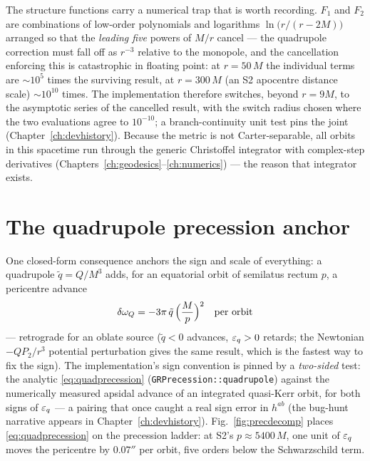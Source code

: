 The structure functions carry a numerical trap that is worth recording.
$F_1$ and $F_2$ are combinations of low-order polynomials and
logarithms $\ln\!\bigl(r/(r-2M)\bigr)$ arranged so that the
\emph{leading five} powers of $M/r$ cancel — the quadrupole correction
must fall off as $r^{-3}$ relative to the monopole, and the cancellation
enforcing this is catastrophic in floating point: at $r = 50\,M$ the
individual terms are $\sim 10^{5}$ times the surviving result, at
$r = 300\,M$ (an S2 apocentre distance scale) $\sim 10^{10}$ times.
The implementation therefore switches, beyond $r = 9M$, to the
asymptotic series of the cancelled result, with the switch radius chosen
where the two evaluations agree to $10^{-10}$; a branch-continuity unit
test pins the joint (Chapter~\ref{ch:devhistory}). Because the metric is
not Carter-separable, all orbits in this spacetime run through the
generic Christoffel integrator with complex-step derivatives
(Chapters~\ref{ch:geodesics}--\ref{ch:numerics}) — the reason that
integrator exists.

\section{The quadrupole precession anchor}
\label{sec:quadprec}

One closed-form consequence anchors the sign and scale of everything: a
quadrupole $\tilde q = Q/M^3$ adds, for an equatorial orbit of
semilatus rectum $p$, a pericentre advance
\begin{equation}
\delta\omega_Q = -3\pi\,\tilde q\,\Bigl(\frac{M}{p}\Bigr)^{2}
\quad\text{per orbit}
\label{eq:quadprecession}
\end{equation}
\citep{Will2008} — retrograde for an oblate source ($\tilde q < 0$
advances, $\varepsilon_q > 0$ retards; the Newtonian $-QP_2/r^3$ potential
perturbation gives the same result, which is the fastest way to fix the
sign). The implementation's sign convention is pinned by a
\emph{two-sided} test: the analytic \eqref{eq:quadprecession}
(\texttt{GRPrecession::quadrupole}) against the numerically measured
apsidal advance of an integrated quasi-Kerr orbit, for both signs of
$\varepsilon_q$ — a pairing that once caught a real sign error in $h^{ab}$
(the bug-hunt narrative appears in Chapter~\ref{ch:devhistory}).
Fig.~\ref{fig:precdecomp} places \eqref{eq:quadprecession} on the
precession ladder: at S2's $p \approx 5400\,M$, one unit of $\varepsilon_q$
moves the pericentre by $0.07''$ per orbit, five orders below the
Schwarzschild term.

